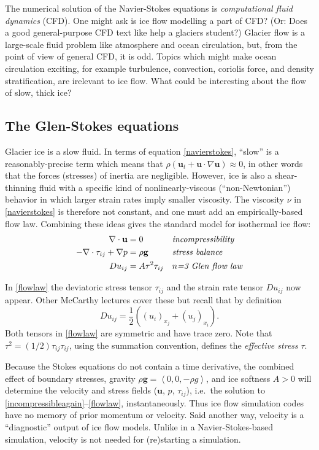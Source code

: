 \documentclass[letterpaper,final,12pt,reqno]{amsart}
\newcommand{\bu}{\mathbf{u}}
\begin{document}
The numerical solution of the Navier-Stokes equations is \emph{computational fluid dynamics} (CFD).  One might ask is ice flow modelling a part of CFD?  (Or: Does a good general-purpose CFD text like \cite{Wesseling} help a glaciers student?)  Glacier flow is a large-scale fluid problem like atmosphere and ocean circulation, but, from the point of view of general CFD, it is odd.   Topics which might make ocean circulation exciting, for example turbulence, convection, coriolis force, and density stratification, are irelevant to ice flow.  What could be interesting about the flow of slow, thick ice?

\subsection*{The Glen-Stokes equations}  Glacier ice is a slow fluid.  In terms of equation \eqref{navierstokes}, ``slow'' is a reasonably-precise term which means that $\rho \left(\mathbf{u}_t + \mathbf{u}\cdot\nabla \mathbf{u}\right) \approx 0$, in other words that the forces (stresses) of inertia are negligible.  However, ice is also a shear-thinning fluid with a specific kind of nonlinearly-viscous (``non-Newtonian'') behavior in which larger strain rates imply smaller viscosity.  The viscosity $\nu$ in \eqref{navierstokes} is therefore not constant, and one must add an empirically-based flow law.  Combining these ideas gives the standard model for isothermal ice flow:
\begin{align}
\nabla \cdot \mathbf{u} &= 0 &&\text{\emph{incompressibility}} \label{incompressibleagain} \\
- \nabla \cdot \tau_{ij} + \nabla p &= \rho \mathbf{g} &&\text{\emph{stress balance}} \label{forcebalance} \\
Du_{ij} &= A \tau^2 \tau_{ij} &&\text{\emph{$n$=3 Glen flow law}} \label{flowlaw}
\end{align}

In \eqref{flowlaw} the deviatoric stress tensor $\tau_{ij}$ and the strain rate tensor $Du_{ij}$ now appear.  Other McCarthy lectures cover these but recall that by definition
    $$Du_{ij} = \frac{1}{2} \left((u_i)_{x_j}+(u_j)_{x_i}\right).$$
Both tensors in \eqref{flowlaw} are symmetric and have trace zero.  Note that $\tau^2 = (1/2) \tau_{ij} \tau_{ij}$, using the summation convention, defines the \emph{effective stress} $\tau$.

Because the Stokes equations do not contain a time derivative, the combined effect of boundary stresses, gravity $\rho \mathbf{g} = \left<0,0,-\rho g\right>$, and ice softness $A>0$ will determine the velocity and stress fields ($\bu$, $p$, $\tau_{ij}$), i.e.~the solution to \eqref{incompressibleagain}--\eqref{flowlaw}, instantaneously.  Thus ice flow simulation codes have no memory of prior momentum or velocity.  Said another way, velocity is a ``diagnostic'' output of ice flow models.  Unlike in a Navier-Stokes-based simulation, velocity is not needed for (re)starting a simulation.
\end{document}
